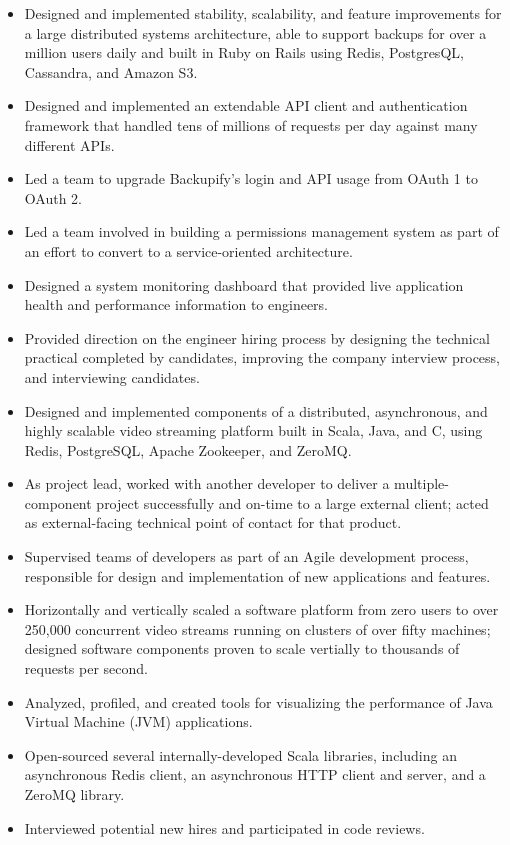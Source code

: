 \documentclass[11pt,a4paper,sans]{moderncv}
\begin{document}
{ \begin{itemize} \itemsep -1pt
  \item Designed and implemented stability, scalability, and feature improvements for a large distributed systems architecture, able to support backups for over a million users daily and built in Ruby on Rails using Redis, PostgresQL, Cassandra, and Amazon S3.\item Designed and implemented an extendable API client and authentication framework that handled tens of millions of requests per day against many different APIs.\item Led a team to upgrade Backupify's login and API usage from OAuth 1 to OAuth 2.\item Led a team involved in building a permissions management system as part of an effort to convert to a service-oriented architecture.\item Designed a system monitoring dashboard that provided live application health and performance information to engineers.\item Provided direction on the engineer hiring process by designing the technical practical completed by candidates, improving the company interview process, and interviewing candidates.
\end{itemize} }
  
{ \begin{itemize} \itemsep -1pt
  \item Designed and implemented components of a distributed, asynchronous, and highly scalable video streaming platform built in Scala, Java, and C, using Redis, PostgreSQL, Apache Zookeeper, and ZeroMQ.\item As project lead, worked with another developer to deliver a multiple-component project successfully and on-time to a large external client; acted as external-facing technical point of contact for that product.\item Supervised teams of developers as part of an Agile development process, responsible for design and implementation of new applications and features.\item Horizontally and vertically scaled a software platform from zero users to over 250,000 concurrent video streams running on clusters of over fifty machines; designed software components proven to scale vertially to thousands of requests per second.\item Analyzed, profiled, and created tools for visualizing the performance of Java Virtual Machine (JVM) applications.\item Open-sourced several internally-developed Scala libraries, including an asynchronous Redis client, an asynchronous HTTP client and server, and a ZeroMQ library.\item Interviewed potential new hires and participated in code reviews.
\end{itemize} }
  
\end{document}
